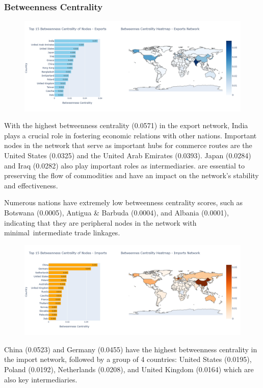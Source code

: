 \documentclass[12pt, a4paper]{article}
\begin{document}
\subsubsection{Betweenness Centrality}
\begin{figure}[ht]
\centering
\includegraphics[width=\textwidth]{img/exportbetween.png}
\label{fig:exportbetween}
\end{figure}
With the highest betweenness centrality (0.0571) in the export network, India plays a crucial role in fostering economic relations with other nations. Important nodes in the network that serve as important hubs for commerce routes are the United States (0.0325) and the United Arab Emirates (0.0393). Japan (0.0284) and Iraq (0.0282) also play important roles as intermediaries. are essential to preserving the flow of commodities and have an impact on the network's stability and effectiveness.

Numerous nations have extremely low betweenness centrality scores, such as Botswana (0.0005), Antigua \& Barbuda (0.0004), and Albania (0.0001), indicating that they are peripheral nodes in the network with minimal intermediate trade linkages.\\

\begin{figure}[ht]
\centering
\includegraphics[width=\textwidth]{img/importbetween.png}
\label{fig:importbetween}
\end{figure}
China (0.0523) and Germany (0.0455) have the highest betweenness centrality in the import network, followed by a group of 4 countries: United States (0.0195), Poland (0.0192), Netherlands (0.0208), and United Kingdom (0.0164) which are also key intermediaries.
\end{document}
